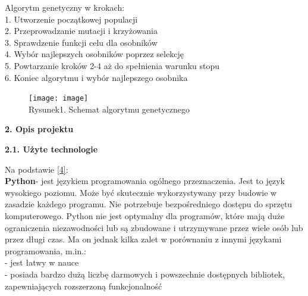 \documentclass[a4paper, twoside, 12pt, justified]{article}
\begin{document}
	Algorytm genetyczny w krokach:\\
	1. Utworzenie początkowej populacji\\
	2. Przeprowadzanie mutacji i krzyżowania\\
	3. Sprawdzenie funkcji celu dla osobników\\
	4. Wybór najlepszych osobników poprzez selekcję\\
	5. Powtarzanie kroków 2-4 aż do spełnienia warunku stopu\\
	6. Koniec algorytmu i wybór najlepszego osobnika
	
	\vspace{10mm}
	
	
	\begin{figure}[h]
	\texttt{[image: image]}
	\centering
	\\
	{Rysunek1. Schemat algorytmu genetycznego} 
	\end{figure}
	
	
	
	\newpage
	\begin{flushleft}
		\begin{large}
			\textbf{2. Opis projektu}
		\end{large}
	\end{flushleft}
	
	\vspace{5mm} %
	
	\begin{flushleft}
		\begin{large}
			\textbf{2.1. Użyte technologie}
		\end{large}
	\end{flushleft}
	\vspace{10mm} %
	
	 Na podstawie \hyperlink{python}{[4]}:\\
	 \textbf{Python}- jest językiem programowania ogólnego przeznaczenia. Jest to język wysokiego poziomu. Może być skutecznie wykorzystywany przy budowie w zasadzie każdego programu. Nie potrzebuje bezpośredniego dostępu do sprzętu komputerowego. Python nie jest optymalny dla programów, które mają duże ograniczenia niezawodności lub są zbudowane i utrzymywane przez wiele osób lub przez długi czas. Ma on jednak kilka zalet w porównaniu z innymi językami programowania, m.in.:\\
	 - jest łatwy w nauce\\ 
	 - posiada bardzo dużą liczbę darmowych i powszechnie dostępnych bibliotek, zapewniających rozszerzoną funkcjonalność\\ \\
	 
\end{document}
